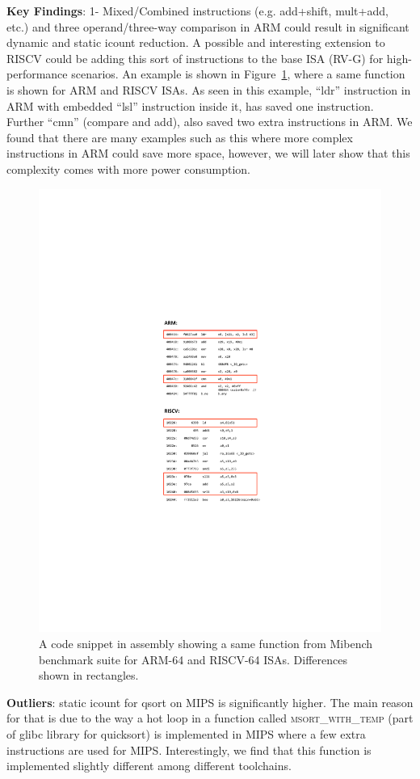 \noindent \textbf{Key Findings}: 1- Mixed/Combined instructions (e.g. add+shift, mult+add, etc.) and three operand/three-way comparison in ARM could result in significant dynamic and static icount reduction. A possible and interesting extension to RISCV could be adding this sort of instructions to the base ISA (RV-G) for high-performance scenarios. An example is shown in Figure~\ref{fig:code}, where a same function is shown for ARM and RISCV ISAs. As seen in this example, ``ldr'' instruction in ARM with embedded ``lsl'' instruction inside it, has saved one instruction. Further ``cmn'' (compare and add), also saved two extra instructions in ARM. We found that there are many examples such as this where more complex instructions in ARM could save more space, however, we will later show that this complexity comes with more power consumption. 

\begin{figure}[t]
	\centering
	\includegraphics[width=0.9\columnwidth]{figures/code.pdf}
	\caption{A code snippet in assembly showing a same function from Mibench benchmark suite for ARM-64 and RISCV-64 ISAs. Differences shown in rectangles.}
	\label{fig:code}
\end{figure} 

\noindent \textbf{Outliers}: static icount for qsort on MIPS is significantly higher. The main reason for that is due to the way a hot loop in a function called \textsc{msort\_with\_temp} (part of glibc library for quicksort) is implemented in MIPS where a few extra instructions are used for MIPS. Interestingly, we find that this function is implemented slightly different among different toolchains. 
